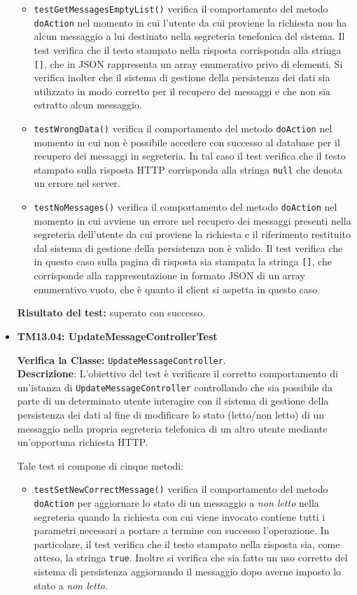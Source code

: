 \begin{itemize}
\begin{itemize}
\item \texttt{testGetMessagesEmptyList()} verifica il comportamento del metodo \texttt{doAction} nel momento in cui l'utente da cui proviene la richiesta non ha alcun messaggio a lui destinato nella segreteria tenefonica del sistema. Il test verifica che il testo stampato nella risposta corrisponda alla stringa \texttt{[]}, che in JSON rappresenta un array enumerativo privo di elementi. Si verifica inolter che il sistema di gestione della persistenza dei dati sia utilizzato in modo corretto per il recupero dei messaggi e che non sia estratto alcun messaggio.

\item \texttt{testWrongData()} verifica il comportamento del metodo \texttt{doAction} nel momento in cui non è possibile accedere con successo al database per il recupero dei messaggi in segreteria. In tal caso il test verifica che il testo stampato sulla risposta HTTP corrisponda alla stringa \texttt{null} che denota un errore nel server.

\item \texttt{testNoMessages()} verifica il comportamento del metodo \texttt{doAction} nel momento in cui avviene un errore nel recupero dei messaggi presenti nella segreteria dell'utente da cui proviene la richiesta e il riferimento restituito dal sistema di gestione della persistenza non è valido. Il test verifica che in questo caso sulla pagina di risposta sia stampata la stringa \texttt{[]}, che corrisponde alla rappresentazione in formato JSON di un array enumerativo vuoto, che è quanto il client si aspetta in questo caso.
\end{itemize}
\textbf{Risultato del test:} superato con successo.


\item \textbf{TM13.04: UpdateMessageControllerTest} 

\textbf{Verifica la Classe:} \texttt{UpdateMessageController}.\\
\textbf{Descrizione}: L'obiettivo del test è verificare il corretto comportamento di un'istanza di \texttt{UpdateMessageController} controllando che sia possibile da parte di un determinato utente interagire con il sistema di gestione della persistenza dei dati al fine di modificare lo stato (letto/non letto) di un messaggio nella propria segreteria telefonica di un altro utente mediante un'opportuna richiesta HTTP\@.

Tale test si compone di cinque metodi:
\begin{itemize}
\item \texttt{testSetNewCorrectMessage()} verifica il comportamento del metodo \texttt{doAction} per aggiornare lo stato di un messaggio a \textit{non letto} nella segreteria quando la richiesta con cui viene invocato contiene tutti i parametri necessari a portare a termine con successo l'operazione. In particolare, il test verifica che il testo stampato nella risposta sia, come atteso, la stringa \texttt{true}. Inoltre si verifica che sia fatto un uso corretto del sistema di persistenza aggiornando il messaggio dopo averne imposto lo stato a \textit{non letto}.


\end{itemize}
\end{itemize}
